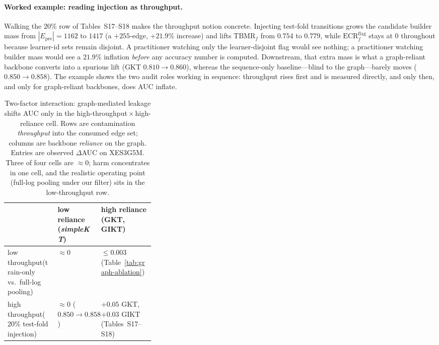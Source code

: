 \documentclass[pdflatex,sn-mathphys-num]{sn-jnl}
\newcommand{\Epre}{\ensuremath{E_{\text{pre}}}}
\begin{document}
\paragraph{Worked example: reading injection as throughput.}
Walking the $20\%$ row of Tables~S17--S18 makes the throughput notion concrete.
Injecting test-fold transitions grows the candidate builder mass from
$|\Epre|{=}1162$ to $1417$ (a ${+}255$-edge, ${+}21.9\%$ increase) and lifts
$\mathrm{TBMR}_f$ from $0.754$ to $0.779$, while $\mathrm{ECR}^{\mathrm{flag}}_f$
stays at $0$ throughout because learner-id sets remain disjoint. A practitioner
watching only the learner-disjoint flag would see nothing; a practitioner
watching builder mass would see a $21.9\%$ inflation \emph{before} any accuracy
number is computed. Downstream, that extra mass is what a graph-reliant
backbone converts into a spurious lift (GKT $0.810\!\to\!0.860$), whereas the
sequence-only baseline---blind to the graph---barely moves ($0.850\!\to\!0.858$).
The example shows the two audit roles working in sequence: throughput rises
first and is measured directly, and only then, and only for graph-reliant
backbones, does AUC inflate.

\begin{table}[t]
\centering
\caption{Two-factor interaction: graph-mediated leakage shifts AUC only in the
high-throughput\,$\times$\,high-reliance cell. Rows are contamination
\emph{throughput} into the consumed edge set; columns are backbone
\emph{reliance} on the graph. Entries are observed $\Delta$AUC on XES3G5M.
Three of four cells are ${\approx}0$; harm concentrates in one cell, and the
realistic operating point (full-log pooling under our filter) sits in the
low-throughput row.}
\label{tab:two-factor}
\footnotesize
\setlength{\tabcolsep}{4pt}
\begin{tabularx}{\linewidth}{@{} >{\RaggedRight\arraybackslash}p{0.34\linewidth}
  >{\centering\arraybackslash}X >{\centering\arraybackslash}X @{}}
\toprule
 & low reliance (\textit{simpleKT}) & high reliance (GKT, GIKT) \\
\midrule
low throughput\newline (train-only vs.\ full-log pooling) &
  ${\approx}0$ &
  ${\leq}0.003$ (Table~\ref{tab:graph-ablation}) \\
high throughput\newline ($20\%$ test-fold injection) &
  ${\approx}0$ ($0.850{\to}0.858$) &
  $+0.05$ GKT, $+0.03$ GIKT (Tables~S17--S18) \\
\bottomrule
\end{tabularx}
\end{table}
\end{document}
